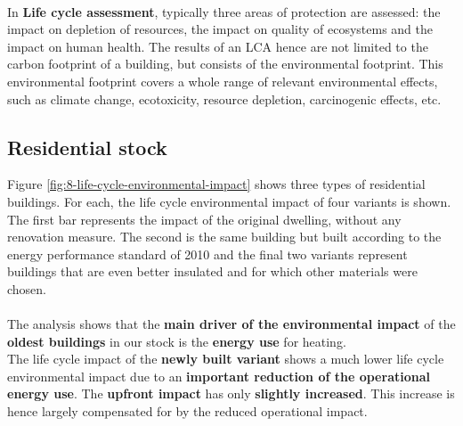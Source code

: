 \documentclass[../summary.tex]{subfiles}
\begin{document}
	\ \\
	In \textbf{Life cycle assessment}, typically three areas of protection are assessed: the impact on depletion of resources, the impact on quality of ecosystems and the impact on human health. The results of an LCA hence are not limited to the carbon footprint of a building, but consists of the environmental footprint. This environmental footprint covers a whole range of relevant environmental effects, such as climate change, ecotoxicity, resource depletion, carcinogenic effects, etc.
	
	
	
	\subsection{Residential stock}
	
	Figure \ref{fig:8-life-cycle-environmental-impact} shows three types of residential buildings. For each,  the life cycle environmental impact of four variants is shown. The first bar represents the impact of the original dwelling, without any renovation measure. The second is the same building but built according to the energy performance standard of 2010 and the final two variants represent buildings that are even better insulated and for which other materials were chosen.\\
	\\
	The analysis shows that the \textbf{main driver of the environmental impact} of the \textbf{oldest buildings} in our stock is the \textbf{energy use} for heating.\\
	The life cycle impact of the \textbf{newly built variant} shows a much lower life cycle environmental impact due to an \textbf{important reduction of the operational energy use}. The \textbf{upfront impact} has only \textbf{slightly increased}. This increase is hence largely compensated for by the reduced operational impact.
	
\end{document}
